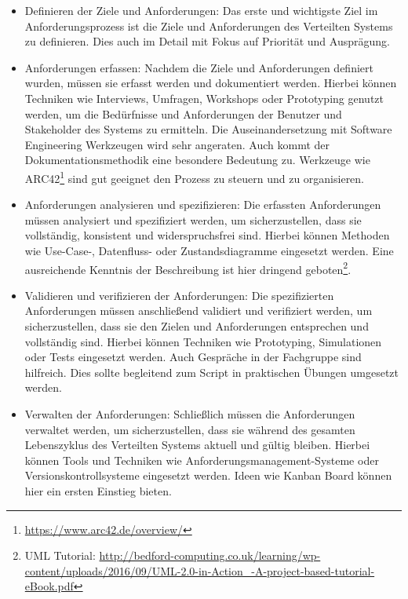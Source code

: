 \begin{itemize}   
\item Definieren der Ziele und Anforderungen: Das erste und wichtigste Ziel im Anforderungsprozess ist die Ziele und Anforderungen des Verteilten Systems zu definieren. Dies auch im Detail mit Fokus auf Priorität und  Ausprägung.

\item Anforderungen erfassen: Nachdem die Ziele und Anforderungen definiert wurden, müssen sie erfasst werden und dokumentiert werden. Hierbei können Techniken wie Interviews, Umfragen, Workshops oder Prototyping genutzt werden, um die Bedürfnisse und Anforderungen der Benutzer und Stakeholder des Systems zu ermitteln. Die Auseinandersetzung mit Software Engineering Werkzeugen wird sehr angeraten. Auch kommt der Dokumentationsmethodik eine besondere Bedeutung zu. Werkzeuge wie ARC42\footnote{\url{https://www.arc42.de/overview/}} sind gut geeignet den Prozess zu steuern und zu organisieren. 

\item Anforderungen analysieren und spezifizieren: Die erfassten Anforderungen müssen analysiert und spezifiziert werden, um sicherzustellen, dass sie vollständig, konsistent und widerspruchsfrei sind. Hierbei können Methoden wie Use-Case-, Datenfluss- oder Zustandsdiagramme eingesetzt werden. Eine ausreichende Kenntnis der Beschreibung ist hier dringend geboten\footnote{UML Tutorial: \url{ http://bedford-computing.co.uk/learning/wp-content/uploads/2016/09/UML-2.0-in-Action_-A-project-based-tutorial-eBook.pdf}}. 

\item Validieren und verifizieren der Anforderungen: Die spezifizierten Anforderungen müssen anschließend validiert und verifiziert werden, um sicherzustellen, dass sie den Zielen und Anforderungen entsprechen und vollständig sind. Hierbei können Techniken wie Prototyping, Simulationen oder Tests eingesetzt werden. Auch Gespräche in der Fachgruppe sind hilfreich. Dies sollte begleitend zum Script in praktischen Übungen umgesetzt werden.

\item Verwalten der Anforderungen: Schließlich müssen die Anforderungen verwaltet werden, um sicherzustellen, dass sie während des gesamten Lebenszyklus des Verteilten Systems aktuell und gültig bleiben. Hierbei können Tools und Techniken wie Anforderungsmanagement-Systeme oder Versionskontrollsysteme eingesetzt werden. Ideen wie Kanban Board können hier ein ersten Einstieg bieten.
\end{itemize}   

